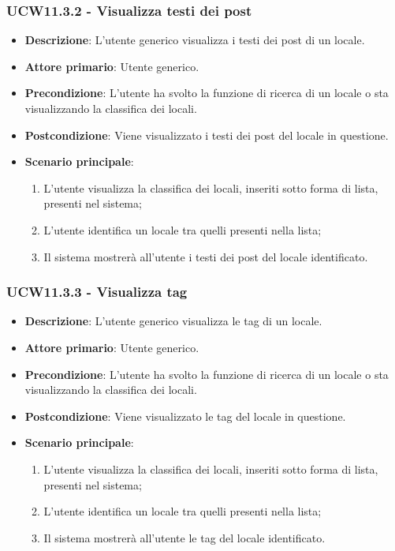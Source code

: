 \subsubsection{UCW11.3.2 - Visualizza testi dei post}
\begin{itemize}
    \item \textbf{Descrizione}: L'utente generico visualizza i testi dei post di un locale.
    \item \textbf{Attore primario}: Utente generico.
    \item \textbf{Precondizione}: L'utente ha svolto la funzione di ricerca di un locale o sta visualizzando la classifica dei locali.
    \item \textbf{Postcondizione}: Viene visualizzato i testi dei post del locale in questione.
    \item \textbf{Scenario principale}: 
    \begin{enumerate}
        \item L'utente visualizza la classifica dei locali, inseriti sotto forma di lista, presenti nel sistema;
        \item L'utente identifica un locale tra quelli presenti nella lista;
        \item Il sistema mostrerà all'utente i testi dei post del locale identificato.
        \end{enumerate}
\end{itemize}
\subsubsection{UCW11.3.3 - Visualizza tag}
\begin{itemize}
    \item \textbf{Descrizione}: L'utente generico visualizza le tag di un locale.
    \item \textbf{Attore primario}: Utente generico.
    \item \textbf{Precondizione}: L'utente ha svolto la funzione di ricerca di un locale o sta visualizzando la classifica dei locali.
    \item \textbf{Postcondizione}: Viene visualizzato le tag del locale in questione.
    \item \textbf{Scenario principale}: 
    \begin{enumerate}
        \item L'utente visualizza la classifica dei locali, inseriti sotto forma di lista, presenti nel sistema;
        \item L'utente identifica un locale tra quelli presenti nella lista;
        \item Il sistema mostrerà all'utente le tag del locale identificato.
        \end{enumerate}
\end{itemize}